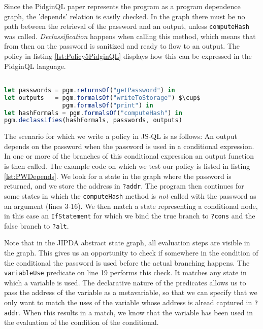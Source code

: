 Since the PidginQL paper represents the program as a program dependence graph, the 'depends' relation is easily checked. In the graph there must be no path between the retrieval of the password and an output, unless \texttt{computeHash} was called. \textit{Declassification} happens when calling this method, which means that from then on the password is sanitized and ready to flow to an output. The policy in listing \ref{lst:Policy5PidginQL} displays how this can be expressed in the PidginQL language.

\begin{lstlisting}[label={lst:Policy5PidginQL},language=JavaScript,caption=Policy 5 in PidginQL,mathescape=true]  % float=t?

let passwords = pgm.returnsOf("getPassword") in 
let outputs   = pgm.formalsOf("writeToStorage") $\cup$
                pgm.formalsOf("print") in
let hashFormals = pgm.formalsOf("computeHash") in
pgm.declassifies(hashFormals, passwords, outputs)
\end{lstlisting}

The scenario for which we write a policy in JS-QL is as follows: An output depends on the password when the password is used in a conditional expression. In one or more of the branches of this conditional expression an output function is then called. The example code on which we test our policy is listed in listing \ref{lst:PWDepends}. We look for a state in the graph where the password is returned, and we store the address in \texttt{?addr}. The program then continues for some states in which the \texttt{computeHash} method is \textit{not} called with the password as an argument (lines 3-16). We then match a state representing a conditional node, in this case an \texttt{IfStatement} for which we bind the true branch to \texttt{?cons} and the false branch to \texttt{?alt}. 

Note that in the JIPDA abstract state graph, all evaluation steps are visible in the graph. This gives us an opportunity to check if somewhere in the condition of the conditional the password is used before the actual branching happens. The \texttt{variableUse} predicate on line 19 performs this check. It matches any state in which a variable is used. The declarative nature of the predicates allows us to pass the address of the variable as a metavariable, so that we can specify that we only want to match the uses of the variable whose address is alread captured in \texttt{?addr}. When this results in a match, we know that the variable has been used in the evaluation of the condition of the conditional. 

